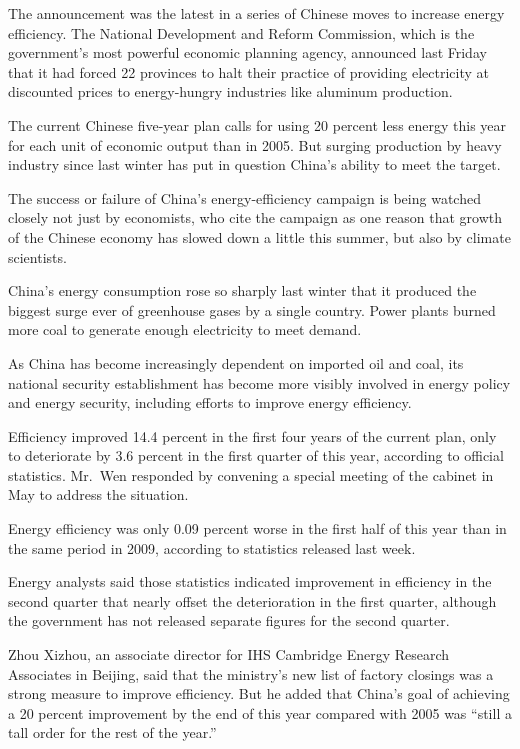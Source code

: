 ﻿\documentclass[12pt]{article}
\begin{document}
The announcement was the latest in a series of Chinese moves to increase energy efficiency. The
National Development and Reform Commission, which is the government's most powerful economic
planning agency, announced last Friday that it had forced 22 provinces to halt their practice of
providing electricity at discounted prices to energy-hungry industries like aluminum production.

The current Chinese five-year plan calls for using 20 percent less energy this year for each unit of
economic output than in 2005. But surging production by heavy industry since last winter has put in
question China's ability to meet the target.

The success or failure of China's energy-efficiency campaign is being watched closely not just by
economists, who cite the campaign as one reason that growth of the Chinese economy has slowed down a
little this summer, but also by climate scientists.

China's energy consumption rose so sharply last winter that it produced the biggest surge ever of
greenhouse gases by a single country. Power plants burned more coal to generate enough electricity
to meet demand.

As China has become increasingly dependent on imported oil and coal, its national security
establishment has become more visibly involved in energy policy and energy security, including
efforts to improve energy efficiency.

Efficiency improved 14.4 percent in the first four years of the current plan, only to deteriorate by
3.6 percent in the first quarter of this year, according to official statistics. Mr.~Wen responded
by convening a special meeting of the cabinet in May to address the situation.

Energy efficiency was only 0.09 percent worse in the first half of this year than in the same period
in 2009, according to statistics released last week.

Energy analysts said those statistics indicated improvement in efficiency in the second quarter that
nearly offset the deterioration in the first quarter, although the government has not released
separate figures for the second quarter.

Zhou Xizhou, an associate director for IHS Cambridge Energy Research Associates in Beijing, said
that the ministry's new list of factory closings was a strong measure to improve efficiency. But he
added that China's goal of achieving a 20 percent improvement by the end of this year compared with
2005 was ``still a tall order for the rest of the year.''
\end{document}
